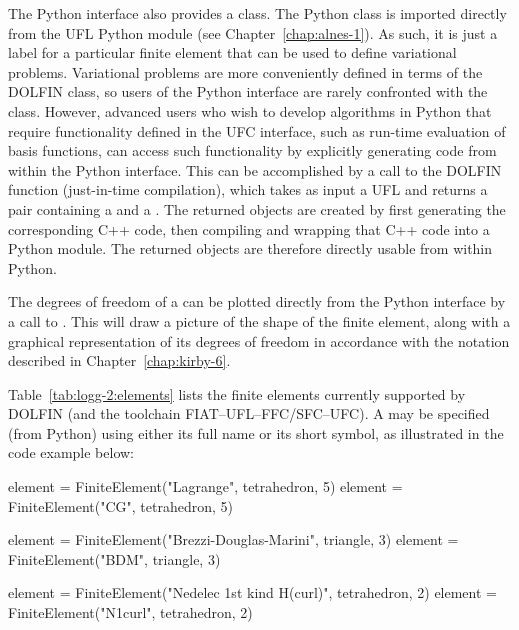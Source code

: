 The Python interface also provides a  class.
The Python  class is
imported directly from the UFL Python module (see
Chapter~\ref{chap:alnes-1}). As such, it is just a label for a
particular finite element that can be used to define variational
problems. Variational problems are more conveniently defined in
terms of the DOLFIN  class,
so users of the Python interface are rarely confronted with
the  class. However, advanced users who wish to
develop algorithms in Python that require functionality defined in the
UFC interface, such as run-time evaluation of basis functions, can
access such functionality by explicitly generating code from within
the Python interface. This can be accomplished by a call to the
DOLFIN  function (just-in-time compilation), which takes as
input a UFL  and returns a pair containing a
 and a . The returned
objects are created by first generating the corresponding C++ code,
then compiling and wrapping that C++ code into a Python module. The
returned objects are therefore directly usable from within Python.

The degrees of freedom of a  can be plotted directly
from the Python interface by a call to . This will
draw a picture of the shape of the finite element, along with a graphical
representation of its degrees of freedom in accordance with the notation
described in Chapter~\ref{chap:kirby-6}.

Table~\ref{tab:logg-2:elements} lists the finite elements currently
supported by DOLFIN (and the toolchain FIAT--UFL--FFC/SFC--UFC). A
 may be specified (from Python) using either its full
name or its short symbol, as illustrated in the code example below:
\begin{uflcode}
element = FiniteElement("Lagrange", tetrahedron, 5)
element = FiniteElement("CG", tetrahedron, 5)

element = FiniteElement("Brezzi-Douglas-Marini", triangle, 3)
element = FiniteElement("BDM", triangle, 3)

element = FiniteElement("Nedelec 1st kind H(curl)", tetrahedron, 2)
element = FiniteElement("N1curl", tetrahedron, 2)
\end{uflcode}

